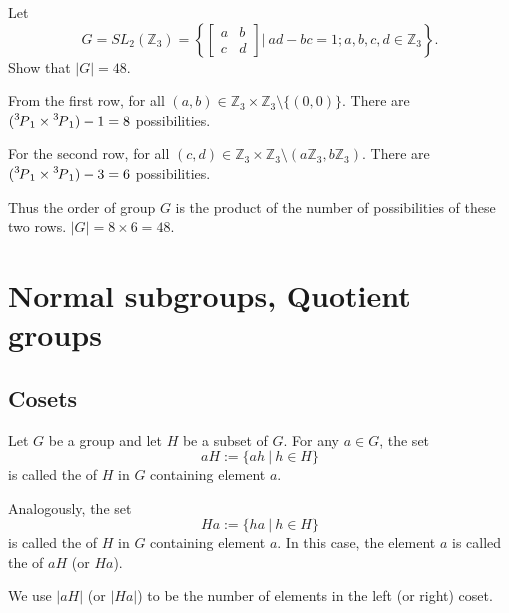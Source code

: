 \begin{example}
    Let 
    \[
        G = SL_2(\mathbb{Z}_3) = \left\{ \begin{bmatrix}
        a & b\\ c & d
        \end{bmatrix} \bigg \vert \> ad-bc = 1; a, b, c, d \in \mathbb{Z}_3 \right\}.
    \]
    Show that $|G| = 48$.
\end{example}
\begin{solution}
    From the first row, for all $(a,b) \in \mathbb{Z}_3 \times \mathbb{Z}_3 \setminus \{ (0,0)\}$. There are 
    $(\perm[3]{1} \times \perm[3]{1}) - 1 = 8$ possibilities.

    For the second row, for all $(c,d) \in \mathbb{Z}_3 \times \mathbb{Z}_3 \setminus (a\mathbb{Z}_3, b\mathbb{Z}_3)$.
    There are $(\perm[3]{1} \times \perm[3]{1}) - 3 = 6$ possibilities.

    Thus the order of group $G$ is the product of the number of possibilities of these two rows. $|G| = 8 \times 6 = 48$.
\end{solution}

\newpage
\section{Normal subgroups, Quotient groups}

\subsection{Cosets}

\begin{definition}[Cosets]
    Let $G$ be a group and let $H$ be a subset of $G$. For any $a \in G$, the set 
    \[
        aH := \{ ah \> | \> h\in H\}
    \]
    is called the  of $H$ in $G$ containing element $a$. 

    Analogously, the set 
    \[
        Ha := \{ ha \> | \> h\in H\}
    \]
    is called the  of $H$ in $G$ containing element $a$.
    In this case, the element $a$ is called the  of 
    $aH$ (or $Ha$). 

    We use $|aH|$ (or $|Ha|$) to be the number of elements in the left (or right) coset.
\end{definition}

